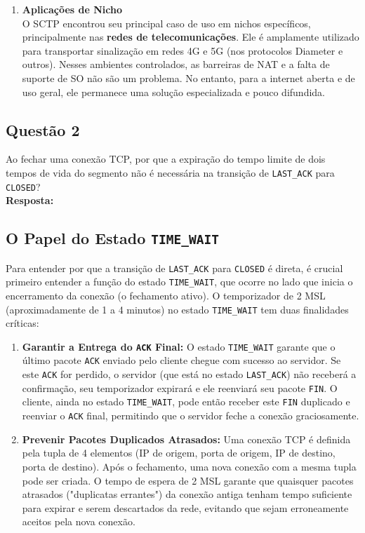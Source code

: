 \begin{enumerate}[label=\alph*.]
\begin{enumerate}
    \item \textbf{Aplicações de Nicho}\\
    O SCTP encontrou seu principal caso de uso em nichos específicos, principalmente nas \textbf{redes de telecomunicações}. Ele é amplamente utilizado para transportar sinalização em redes 4G e 5G (nos protocolos Diameter e outros). Nesses ambientes controlados, as barreiras de NAT e a falta de suporte de SO não são um problema. No entanto, para a internet aberta e de uso geral, ele permanece uma solução especializada e pouco difundida.
\end{enumerate}
\end{enumerate}


\subsection{Questão 2}
 Ao fechar uma conexão TCP, por que a expiração do tempo limite de dois tempos de vida do
segmento não é necessária na transição de \texttt{LAST\_ACK} para \texttt{CLOSED}?\\


\noindent
\textbf{Resposta:}

\subsection*{O Papel do Estado \texttt{TIME\_WAIT}}
Para entender por que a transição de \texttt{LAST\_ACK} para \texttt{CLOSED} é direta, é crucial primeiro entender a função do estado \texttt{TIME\_WAIT}, que ocorre no lado que inicia o encerramento da conexão (o fechamento ativo). O temporizador de 2 MSL (aproximadamente de 1 a 4 minutos) no estado \texttt{TIME\_WAIT} tem duas finalidades críticas:

\begin{enumerate}
    \item \textbf{Garantir a Entrega do \texttt{ACK} Final:} O estado \texttt{TIME\_WAIT} garante que o último pacote \texttt{ACK} enviado pelo cliente chegue com sucesso ao servidor. Se este \texttt{ACK} for perdido, o servidor (que está no estado \texttt{LAST\_ACK}) não receberá a confirmação, seu temporizador expirará e ele reenviará seu pacote \texttt{FIN}. O cliente, ainda no estado \texttt{TIME\_WAIT}, pode então receber este \texttt{FIN} duplicado e reenviar o \texttt{ACK} final, permitindo que o servidor feche a conexão graciosamente.

    \item \textbf{Prevenir Pacotes Duplicados Atrasados:} Uma conexão TCP é definida pela tupla de 4 elementos (IP de origem, porta de origem, IP de destino, porta de destino). Após o fechamento, uma nova conexão com a mesma tupla pode ser criada. O tempo de espera de 2 MSL garante que quaisquer pacotes atrasados ("duplicatas errantes") da conexão antiga tenham tempo suficiente para expirar e serem descartados da rede, evitando que sejam erroneamente aceitos pela nova conexão.
\end{enumerate}

